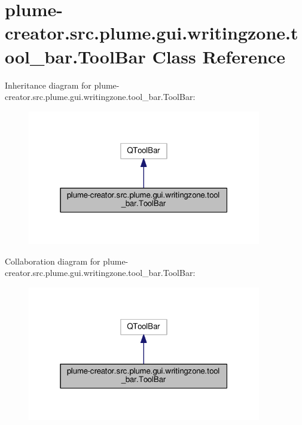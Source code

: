 \hypertarget{classplume-creator_1_1src_1_1plume_1_1gui_1_1writingzone_1_1tool__bar_1_1_tool_bar}{}\section{plume-\/creator.src.\+plume.\+gui.\+writingzone.\+tool\+\_\+bar.\+Tool\+Bar Class Reference}
\label{classplume-creator_1_1src_1_1plume_1_1gui_1_1writingzone_1_1tool__bar_1_1_tool_bar}


Inheritance diagram for plume-\/creator.src.\+plume.\+gui.\+writingzone.\+tool\+\_\+bar.\+Tool\+Bar\+:\nopagebreak
\begin{figure}[H]
\begin{center}
\leavevmode
\includegraphics[width=289pt]{classplume-creator_1_1src_1_1plume_1_1gui_1_1writingzone_1_1tool__bar_1_1_tool_bar__inherit__graph}
\end{center}
\end{figure}


Collaboration diagram for plume-\/creator.src.\+plume.\+gui.\+writingzone.\+tool\+\_\+bar.\+Tool\+Bar\+:\nopagebreak
\begin{figure}[H]
\begin{center}
\leavevmode
\includegraphics[width=289pt]{classplume-creator_1_1src_1_1plume_1_1gui_1_1writingzone_1_1tool__bar_1_1_tool_bar__coll__graph}
\end{center}
\end{figure}
